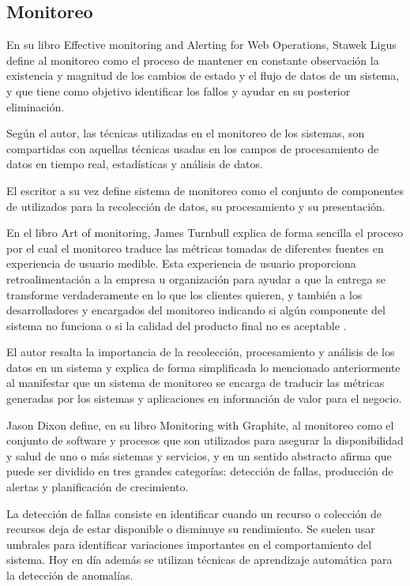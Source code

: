 \subsection{Monitoreo}
\label{monitoreo}

En su libro Effective monitoring and Alerting for Web Operations, Stawek Ligus
define al monitoreo como el proceso de mantener en constante observación la
existencia y magnitud de los cambios de estado y el flujo de datos de un
sistema, y que tiene como objetivo identificar los fallos y ayudar en su
posterior eliminación\cite[p.~2]{monitoreo:efective_monitoring_and_alerting}.

Según el autor, las técnicas utilizadas en el monitoreo de los sistemas, son
compartidas con aquellas técnicas usadas en los campos de procesamiento de
datos en tiempo real, estadísticas y análisis de datos.

El escritor a su vez define sistema de monitoreo como el conjunto de
componentes de  utilizados para la recolección de datos, su
procesamiento y su presentación.

En el libro Art of monitoring, James Turnbull explica de forma sencilla el
proceso por el cual el monitoreo traduce las métricas tomadas de diferentes
fuentes en experiencia de usuario medible. Esta experiencia de usuario
proporciona retroalimentación a la empresa u organización para ayudar a que la
entrega se transforme verdaderamente en lo que los clientes quieren, y también
a los desarrolladores y encargados del monitoreo indicando si algún componente
del sistema no funciona o si la calidad del producto final no es aceptable
\cite[p.~8]{monitoreo:art_of_monitoring}.

El autor resalta la importancia de la recolección, procesamiento y análisis de
los datos en un sistema y explica de forma simplificada lo mencionado
anteriormente al manifestar que un sistema de monitoreo se encarga de traducir
las métricas generadas por los sistemas y aplicaciones en información de valor
para el negocio.

Jason Dixon define, en su libro Monitoring with Graphite, al monitoreo como el
conjunto de software y procesos que son utilizados para asegurar la
disponibilidad y salud de uno o más sistemas y servicios, y en un sentido
abstracto afirma que puede ser dividido en tres grandes categorías: detección
de fallas, producción de alertas y planificación de crecimiento.

La detección de fallas consiste en identificar cuando un recurso o colección de
recursos deja de estar disponible o disminuye su rendimiento. Se suelen usar
umbrales para identificar variaciones importantes en el comportamiento del
sistema. Hoy en día además se utilizan técnicas de aprendizaje automática para
la detección de anomalías.

